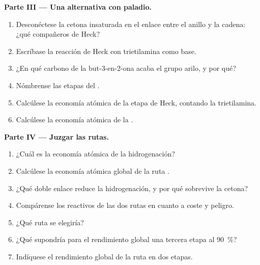 \begin{problem}
\medskip
\noindent\textbf{Parte III --- Una alternativa con paladio.}
\begin{enumerate}[resume]
  \item Desconéctese la cetona insaturada en el enlace entre el anillo y la cadena: ¿qué compañeros de
        Heck?
  \item Escríbase la reacción de Heck con trietilamina como base.
  \item ¿En qué carbono de la but-3-en-2-ona acaba el grupo arilo, y por qué?
  \item Nómbrense las etapas del .
  \item Calcúlese la economía atómica de la etapa de Heck, contando la trietilamina.
  \item Calcúlese la economía atómica de la .
\end{enumerate}

\medskip
\noindent\textbf{Parte IV --- Juzgar las rutas.}
\begin{enumerate}[resume]
  \item ¿Cuál es la economía atómica de la hidrogenación?
  \item Calcúlese la economía atómica global de la ruta .
  \item ¿Qué doble enlace reduce la hidrogenación, y por qué sobrevive la cetona?
  \item Compárense los reactivos de las dos rutas en cuanto a coste y peligro.
  \item ¿Qué ruta se elegiría?
  \item ¿Qué supondría para el rendimiento global una tercera etapa al 90~\%?
  \item Indíquese el rendimiento global de la ruta  en dos etapas.
\end{enumerate}
\end{problem}
